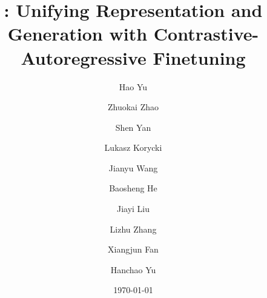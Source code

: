 \documentclass[]{fairmeta}
\title{\algname: Unifying Representation and Generation with Contrastive-Autoregressive Finetuning}
\author[1,2,\dagger]{Hao Yu}
\author[1]{Zhuokai Zhao}
\author[1]{Shen Yan}
\author[1]{Lukasz Korycki}
\author[1]{Jianyu Wang}
\author[1]{Baosheng He}
\author[1]{Jiayi Liu}
\author[1]{Lizhu Zhang}
\author[1]{Xiangjun Fan}
\author[1]{Hanchao Yu}
\affiliation[1]{Meta}
\affiliation[2]{Boston University}
\date{\today}
\begin{document}
\maketitle








\clearpage
\newpage



\clearpage
\newpage
\beginappendix

\end{document}
